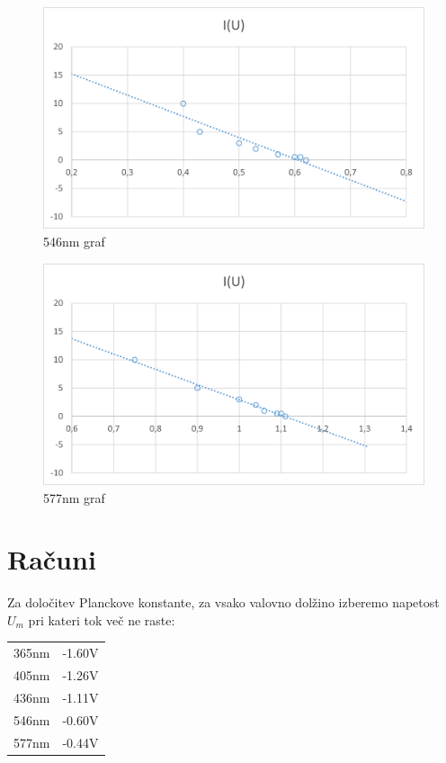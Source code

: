 \documentclass[a4paper]{report}
\begin{document}
\begin{figure}[htp]
    \centering
    \includegraphics[width=\textwidth]{energija in frekvenca graf 4.png}
    \caption{546nm graf}

\end{figure}

\begin{figure}[htp]
    \centering
    \includegraphics[width=\textwidth]{energija in frekvenca graf 5.png}
    \caption{577nm graf}

\end{figure}

\chapter*{Računi}
Za določitev Planckove konstante, za vsako valovno dolžino izberemo napetost $U_m$ pri kateri tok več ne raste:
\\
\begin{center}
\begin{tabular}{ |c|c| }
 \hline
 365nm & -1.60V \\
 405nm & -1.26V \\
 436nm & -1.11V \\
 546nm & -0.60V \\
 577nm & -0.44V  \\
 \hline
\end{tabular}
\end{center}
\end{document}

